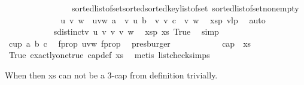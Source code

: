 \begin{isabellebody}
\ \ \ \ \ \ \ \ \ \ \ \ \ \ \ \ sorted{\isacharunderscore}{\kern0pt}list{\isacharunderscore}{\kern0pt}of{\isacharunderscore}{\kern0pt}set{\isachardot}{\kern0pt}sorted{\isacharunderscore}{\kern0pt}sorted{\isacharunderscore}{\kern0pt}key{\isacharunderscore}{\kern0pt}list{\isacharunderscore}{\kern0pt}of{\isacharunderscore}{\kern0pt}set\ sorted{\isacharunderscore}{\kern0pt}list{\isacharunderscore}{\kern0pt}of{\isacharunderscore}{\kern0pt}set{\isacharunderscore}{\kern0pt}nonempty{\isacharparenright}{\kern0pt}\isanewline
\ \ \ \ \ \ \ \ \ \ \isamarkupfalse%
\ \isamarkupfalse%
\ u\ v\ w\ \ uvw{\isacharcolon}{\kern0pt}\ {\isachardoublequoteopen}a\ {\isacharequal}{\kern0pt}\ v{}\ u{\isachardoublequoteclose}\ {\isachardoublequoteopen}b\ {\isacharequal}{\kern0pt}\ v{}\ v{\isachardoublequoteclose}\ {\isachardoublequoteopen}c\ {\isacharequal}{\kern0pt}\ v{}\ w{\isachardoublequoteclose}\ \isamarkupfalse%
\ xsp\ v{}lp\ \isamarkupfalse%
\ auto\isanewline
\ \ \ \ \ \ \ \ \ \ \isamarkupfalse%
\ {\isachardoublequoteopen}sdistinct{\isacharbrackleft}{\kern0pt}v{}\ u{\isacharcomma}{\kern0pt}\ v{}\ v{\isacharcomma}{\kern0pt}\ v{}\ w{\isacharbrackright}{\kern0pt}{\isachardoublequoteclose}\ \isamarkupfalse%
\ xsp\ xs{}\ True\ \isamarkupfalse%
\ simp\isanewline
\ \ \ \ \ \ \ \ \ \ \isamarkupfalse%
\ {\isachardoublequoteopen}cup{}\ a\ b\ c{\isachardoublequoteclose}\ \isamarkupfalse%
\ f{\isacharunderscore}{\kern0pt}prop{}\ uvw\ f{\isacharunderscore}{\kern0pt}prop{}{}\ \isamarkupfalse%
\ presburger\isanewline
\ \ \ \ \ \ \ \ \ \ \isamarkupfalse%
\ {\isachardoublequoteopen}{\isasymnot}{\isacharparenleft}{\kern0pt}cap\ {}\ xs{\isacharparenright}{\kern0pt}{\isachardoublequoteclose}\ \isamarkupfalse%
\ True\ exactly{\isacharunderscore}{\kern0pt}one{\isacharunderscore}{\kern0pt}true\ cap{\isacharunderscore}{\kern0pt}def\ xs{}\ \isamarkupfalse%
\ {\isacharparenleft}{\kern0pt}metis\ list{\isacharunderscore}{\kern0pt}check{\isachardot}{\kern0pt}simps{\isacharparenleft}{\kern0pt}{}{\isacharparenright}{\kern0pt}{\isacharparenright}{\kern0pt}%
\begin{isamarkuptext}%
When  then xs can not be a 3-cap from definition trivially.%

\end{isamarkuptext}
\end{isabellebody}
